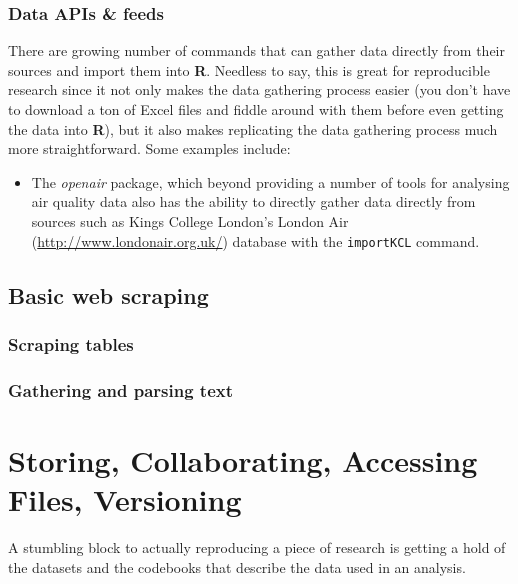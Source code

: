 \documentclass[ChapterTOCs,krantz1]{krantz}\usepackage{graphicx, color}
\begin{document}
\subsection{Data APIs \& feeds}

There are growing number of commands that can gather data directly from
their sources and import them into \textbf{R}. Needless to say, this is
great for reproducible research since it not only makes the data
gathering process easier (you don't have to download a ton of Excel
files and fiddle around with them before even getting the data into
\textbf{R}), but it also makes replicating the data gathering process
much more straightforward. Some examples include:

\begin{itemize}
    \item The \emph{openair} package, which beyond providing a number of tools for analysing air quality data also has the ability to directly gather data directly from sources such as Kings College London's London Air (\url{http://www.londonair.org.uk/}) database with the \texttt{importKCL} command.
\end{itemize}

\section{Basic web scraping}

\subsection{Scraping tables}

\subsection{Gathering and parsing text}





\chapter{Storing, Collaborating, Accessing Files, Versioning}\label{Storing}

A stumbling block to actually reproducing a piece of research is getting a hold of the datasets and the codebooks that describe the data used in
an analysis.
\end{document}
